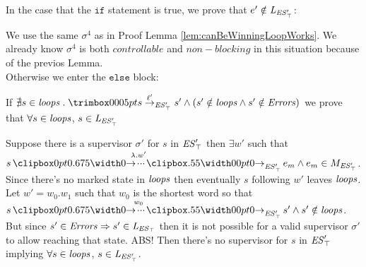 In the case that the $\texttt{if}$ statement is true, we prove that $e' \notin \mathit{L_{\mathit{\mathit{ES}'_{\top}}}}$:

We use the same $\sigma^4$ as in Proof Lemma \ref{lem:canBeWinningLoopWorks}. We already know $\sigma^4$ is both $controllable$ and $non-blocking$ in this situation because of the previos Lemma.\\

Otherwise we enter the $\texttt{else}$ block:

If $\nexists s \in \SCC \ldot \trimlst{s \step{\l'}{\unexploredToTop{\structure'}}  s'} \wedge (s' \notin \SCC \wedge s' \notin \Errors)$ we prove that $\forall s \in \mathit{loops}$, $s \in \mathit{L_{\mathit{\mathit{ES}'_{\top}}}}$

Suppose there is a supervisor $\sigma'$ for $s$ in $\mathit{\mathit{ES}'_{\top}}$ then $\exists w'$ such that $s \runw{\lambda.w'}{\unexploredToTop{\structure'}} e_m \wedge e_m \in M_{\unexploredToTop{\structure'}}$. Since there's no marked state in $\mathit{loops}$ then eventually $s$ following $w'$ leaves $\mathit{loops}$. \\
Let $w' = w_0.w_1$ such that $w_0$ is the shortest word so that $s \runw{w_0}{\unexploredToTop{\structure'}} s' \wedge s' \notin \SCC$. But since $s'\in \mathit{Errors} \Rightarrow s' \in \mathit{L_{\mathit{\mathit{ES}_{\top}}}}$ then it is not possible for a valid supervisor $\sigma'$ to allow reaching that state. ABS! Then there's no supervisor for $s$ in $\mathit{\mathit{ES}'_{\top}}$ implying $\forall s \in \mathit{loops}$, $s \in \mathit{L_{\mathit{\mathit{ES}'_{\top}}}}$.